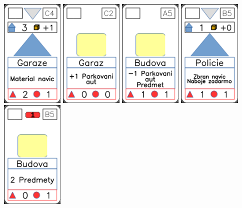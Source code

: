 \documentclass[a4paper]{article}
\begin{document}
	\includegraphics[width=3.0cm]{img-3_13}
	\includegraphics[width=3.0cm]{img-2_11}
	\includegraphics[width=3.0cm]{img-2_4}
	\includegraphics[width=3.0cm]{img-3_9}
	\includegraphics[width=3.0cm]{img-2_9}
\end{document}
